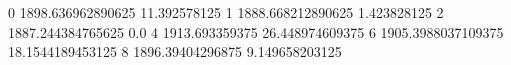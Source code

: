 0 1898.636962890625 11.392578125
1 1888.668212890625 1.423828125
2 1887.244384765625 0.0
4 1913.693359375 26.448974609375
6 1905.3988037109375 18.1544189453125
8 1896.39404296875 9.149658203125
